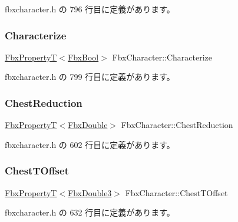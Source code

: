  fbxcharacter.\+h の 796 行目に定義があります。

\mbox{\label{class_fbx_character_aba95c8944cb952c7e5dd0e3ceaba2bb3}} 
\subsubsection{\texorpdfstring{Characterize}{Characterize}}
{\footnotesize\ttfamily \hyperlink{class_fbx_property_t}{Fbx\+PropertyT}$<$\hyperlink{fbxtypes_8h_a92e0562b2fe33e76a242f498b362262e}{Fbx\+Bool}$>$ Fbx\+Character\+::\+Characterize}



 fbxcharacter.\+h の 799 行目に定義があります。

\mbox{\label{class_fbx_character_af9b963a8d92ba9c5e7a67ff3afdcf7df}} 
\subsubsection{\texorpdfstring{Chest\+Reduction}{ChestReduction}}
{\footnotesize\ttfamily \hyperlink{class_fbx_property_t}{Fbx\+PropertyT}$<$\hyperlink{fbxtypes_8h_a171e72a1c46fc15c1a6c9c31948c1c5b}{Fbx\+Double}$>$ Fbx\+Character\+::\+Chest\+Reduction}



 fbxcharacter.\+h の 602 行目に定義があります。

\mbox{\label{class_fbx_character_add78528e2f4e980a41a4b6e2a03ff32d}} 
\subsubsection{\texorpdfstring{Chest\+T\+Offset}{ChestTOffset}}
{\footnotesize\ttfamily \hyperlink{class_fbx_property_t}{Fbx\+PropertyT}$<$\hyperlink{fbxtypes_8h_ae0a96f14cde566774c7553aa7523b7a7}{Fbx\+Double3}$>$ Fbx\+Character\+::\+Chest\+T\+Offset}



 fbxcharacter.\+h の 632 行目に定義があります。


